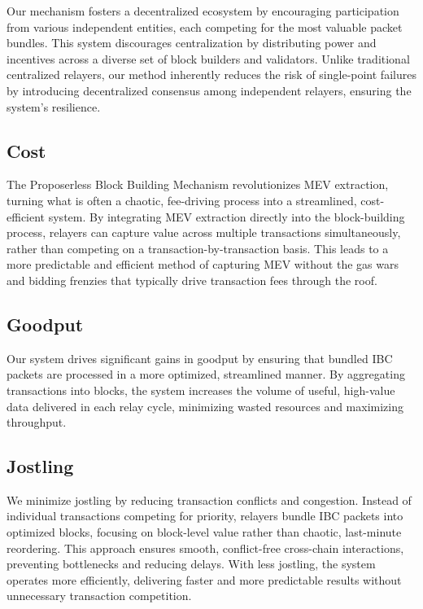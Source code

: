 \documentclass{article}
\begin{document}
Our mechanism fosters a decentralized ecosystem by encouraging participation from various independent entities, each competing for the most valuable packet bundles. This system discourages centralization by distributing power and incentives across a diverse set of block builders and validators. Unlike traditional centralized relayers, our method inherently reduces the risk of single-point failures by introducing decentralized consensus among independent relayers, ensuring the system's resilience.

\subsection{Cost}

The Proposerless Block Building Mechanism revolutionizes MEV extraction, turning what is often a chaotic, fee-driving process into a streamlined, cost-efficient system. By integrating MEV extraction directly into the block-building process, relayers can capture value across multiple transactions simultaneously, rather than competing on a transaction-by-transaction basis. This leads to a more predictable and efficient method of capturing MEV without the gas wars and bidding frenzies that typically drive transaction fees through the roof.

\subsection{Goodput}

Our system drives significant gains in goodput by ensuring that bundled IBC packets are processed in a more optimized, streamlined manner. By aggregating transactions into blocks, the system increases the volume of useful, high-value data delivered in each relay cycle, minimizing wasted resources and maximizing throughput.

\subsection{Jostling}

We minimize jostling by reducing transaction conflicts and congestion. Instead of individual transactions competing for priority, relayers bundle IBC packets into optimized blocks, focusing on block-level value rather than chaotic, last-minute reordering. This approach ensures smooth, conflict-free cross-chain interactions, preventing bottlenecks and reducing delays. With less jostling, the system operates more efficiently, delivering faster and more predictable results without unnecessary transaction competition.
\end{document}
